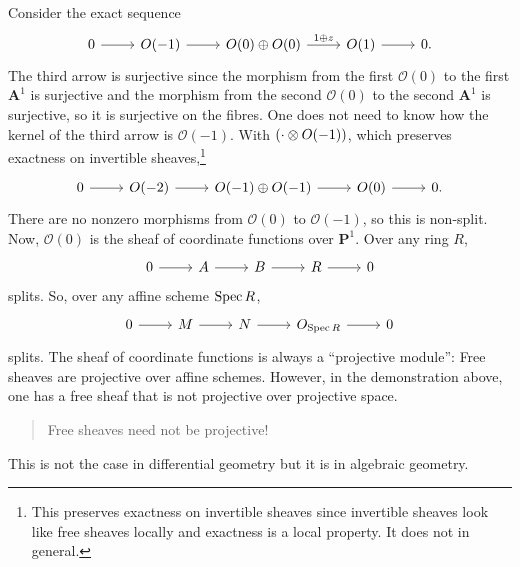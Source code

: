 \documentclass [11 pt, oneside] {article}
\begin{document}
Consider the exact sequence
\[
\begin{tikzcd}
	0\ar[r] &\mathscr{O}(-1) \ar[r]& \mathscr{O}(0) \oplus \mathscr{O}(0)\ar[r,"1\oplus z"] & \mathscr{O}(1)\ar[r]&0.
\end{tikzcd}
\]
The third arrow is surjective since the morphism from the first $\mathscr{O}(0)$ to the first $\mathbf{A}^1$ is surjective and the morphism from the second $\mathscr{O}(0)$ to the second $\mathbf{A}^1$ is surjective, so it is surjective on the fibres. One does not need to know how the kernel of the third arrow is $\mathscr{O}(-1)$. With $(\cdot\otimes \relax{O}(-1))$, which preserves exactness on invertible sheaves,\footnote{This preserves exactness on invertible sheaves since invertible sheaves look like free sheaves locally and exactness is a local property. It does not in general.}
\[
\begin{tikzcd}
	0\ar[r]&\mathscr{O}(-2) \ar[r] &\mathscr{O}(-1) \oplus \mathscr{O}(-1) \ar[r] & \mathscr{O}(0) \ar[r] &0.
\end{tikzcd}
\]
There are no nonzero morphisms from $\mathscr{O}(0)$ to $\mathscr{O}(-1)$, so this is non-split. Now, $\mathscr{O}(0)$ is the sheaf of coordinate functions over $\mathbf{P}^1$. Over any ring $R$,
\[
\begin{tikzcd}
	0\ar[r]&A\ar[r]&B\ar[r]&R\ar[r]&0
\end{tikzcd}
\]
splits. So, over any affine scheme $\operatorname{Spec} R$,
\[
\begin{tikzcd}
	0\ar[r]&\mathscr{M}\ar[r]&\mathscr{N}\ar[r]&\mathscr{O}_{\Spec R}\ar[r]&0
\end{tikzcd}
\]
splits. The sheaf of coordinate functions is always a ``projective module'': Free sheaves are projective over affine schemes. However, in the demonstration above, one has a free sheaf that is not projective over projective space.
\begin{quote}
	\small Free sheaves need not be projective!
\end{quote}
This is not the case in differential geometry but it is in algebraic geometry.
\end{document}
